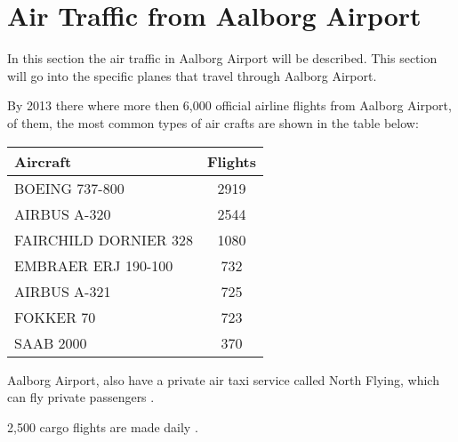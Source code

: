 \section{Air Traffic from Aalborg Airport}

In this section the air traffic in Aalborg Airport will be described. This section will go into the specific planes that travel through Aalborg Airport.


By 2013 there where more then 6,000 official airline flights from Aalborg Airport, of them, the most common types of air crafts are shown in the table below:

\begin{center}
    \begin{tabular}{ | l | c | }
        \hline
        Aircraft & Flights\\ \hline
        BOEING 737-800 & 2919\\ \hline
        AIRBUS A-320 & 2544\\ \hline
        FAIRCHILD DORNIER 328 & 1080\\ \hline
        EMBRAER ERJ 190-100 & 732\\ \hline
        AIRBUS A-321 & 725\\ \hline
        FOKKER 70 & 723\\ \hline
        SAAB 2000 & 370\\ \hline
    \end{tabular}
\end{center}


Aalborg Airport, also have a private air taxi service called North Flying, which can fly private passengers \cite{north_flying}.

2,500 cargo flights are made daily \cite{cargo_lufthavn}.

